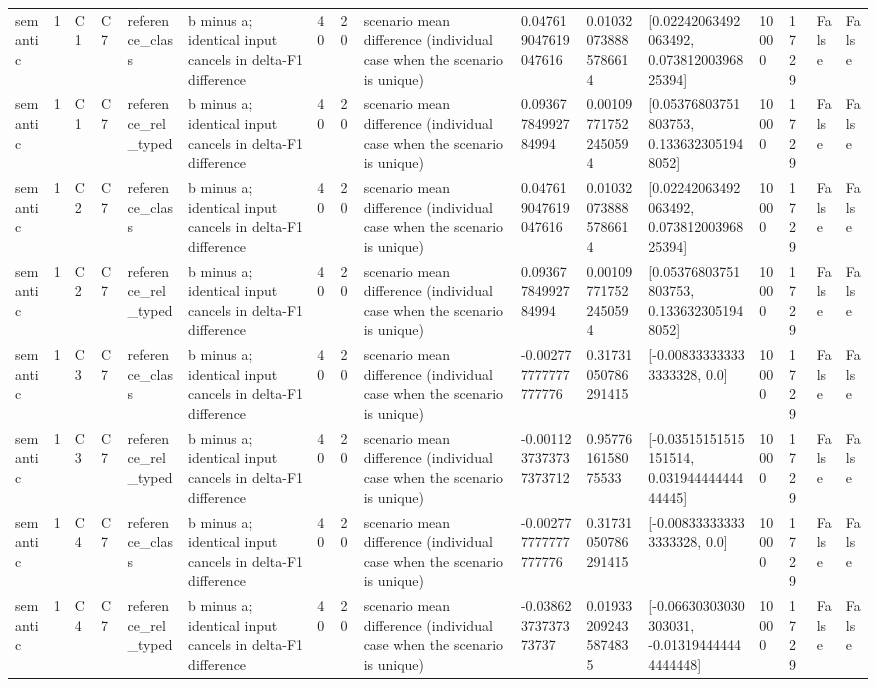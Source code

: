 \begin{tabular}{llllllllllllllll}
semantic & 1 & C1 & C7 & reference\_class & b minus a; identical input cancels in delta-F1 difference & 40 & 20 & scenario mean difference (individual case when the scenario is unique) & 0.047619047619047616 & 0.010320738885786614 & [0.02242063492063492, 0.07381200396825394] & 10000 & 1729 & False & False \\
semantic & 1 & C1 & C7 & reference\_rel\_typed & b minus a; identical input cancels in delta-F1 difference & 40 & 20 & scenario mean difference (individual case when the scenario is unique) & 0.09367784992784994 & 0.001097717522450594 & [0.05376803751803753, 0.1336323051948052] & 10000 & 1729 & False & False \\
semantic & 1 & C2 & C7 & reference\_class & b minus a; identical input cancels in delta-F1 difference & 40 & 20 & scenario mean difference (individual case when the scenario is unique) & 0.047619047619047616 & 0.010320738885786614 & [0.02242063492063492, 0.07381200396825394] & 10000 & 1729 & False & False \\
semantic & 1 & C2 & C7 & reference\_rel\_typed & b minus a; identical input cancels in delta-F1 difference & 40 & 20 & scenario mean difference (individual case when the scenario is unique) & 0.09367784992784994 & 0.001097717522450594 & [0.05376803751803753, 0.1336323051948052] & 10000 & 1729 & False & False \\
semantic & 1 & C3 & C7 & reference\_class & b minus a; identical input cancels in delta-F1 difference & 40 & 20 & scenario mean difference (individual case when the scenario is unique) & -0.002777777777777776 & 0.31731050786291415 & [-0.008333333333333328, 0.0] & 10000 & 1729 & False & False \\
semantic & 1 & C3 & C7 & reference\_rel\_typed & b minus a; identical input cancels in delta-F1 difference & 40 & 20 & scenario mean difference (individual case when the scenario is unique) & -0.0011237373737373712 & 0.9577616158075533 & [-0.03515151515151514, 0.03194444444444445] & 10000 & 1729 & False & False \\
semantic & 1 & C4 & C7 & reference\_class & b minus a; identical input cancels in delta-F1 difference & 40 & 20 & scenario mean difference (individual case when the scenario is unique) & -0.002777777777777776 & 0.31731050786291415 & [-0.008333333333333328, 0.0] & 10000 & 1729 & False & False \\
semantic & 1 & C4 & C7 & reference\_rel\_typed & b minus a; identical input cancels in delta-F1 difference & 40 & 20 & scenario mean difference (individual case when the scenario is unique) & -0.03862373737373737 & 0.019332092435874835 & [-0.06630303030303031, -0.013194444444444448] & 10000 & 1729 & False & False \\

\end{tabular}
